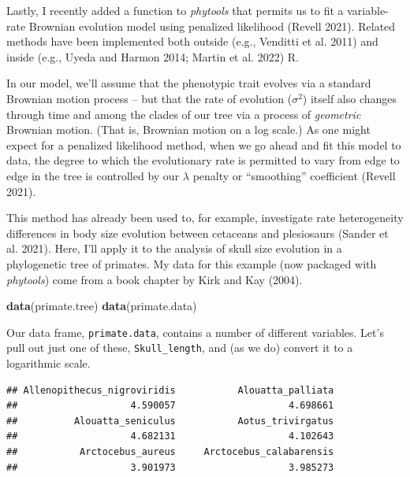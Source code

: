 \documentclass[fleqn,10pt,lineno]{wlpeerj} %
\newenvironment{Shaded}{\begin{snugshade}}{\end{snugshade}}
\newcommand{\FunctionTok}[1]{\textcolor[rgb]{0.13,0.29,0.53}{\textbf{#1}}}
\newcommand{\NormalTok}[1]{#1}
\newcommand{\OtherTok}[1]{\textcolor[rgb]{0.56,0.35,0.01}{#1}}
\newcommand{\SpecialCharTok}[1]{\textcolor[rgb]{0.81,0.36,0.00}{\textbf{#1}}}
\begin{document}
Lastly, I recently added a function to \emph{phytools} that permits us to fit a variable-rate Brownian evolution model using penalized likelihood (Revell 2021). Related methods have been implemented both outside (e.g., Venditti et al. 2011) and inside (e.g., Uyeda and Harmon 2014; Martin et al. 2022) R.

In our model, we'll assume that the phenotypic trait evolves via a standard Brownian motion process -- but that the rate of evolution (\(\sigma^{2}\)) itself also changes through time and among the clades of our tree via a process of \emph{geometric} Brownian motion. (That is, Brownian motion on a log scale.) As one might expect for a penalized likelihood method, when we go ahead and fit this model to data, the degree to which the evolutionary rate is permitted to vary from edge to edge in the tree is controlled by our \(\lambda\) penalty or ``smoothing'' coefficient (Revell 2021).

This method has already been used to, for example, investigate rate heterogeneity differences in body size evolution between cetaceans and plesiosaurs (Sander et al. 2021). Here, I'll apply it to the analysis of skull size evolution in a phylogenetic tree of primates. My data for this example (now packaged with \emph{phytools}) come from a book chapter by Kirk and Kay (2004).

\begin{Shaded}
\begin{Highlighting}[]
\FunctionTok{data}\NormalTok{(primate.tree)}
\FunctionTok{data}\NormalTok{(primate.data)}
\end{Highlighting}
\end{Shaded}

Our data frame, \texttt{primate.data}, contains a number of different variables. Let's pull out just one of these, \texttt{Skull\_length}, and (as we do) convert it to a logarithmic scale.

\begin{Shaded}
\end{Shaded}

\begin{verbatim}
## Allenopithecus_nigroviridis           Alouatta_palliata 
##                    4.590057                    4.698661 
##          Alouatta_seniculus           Aotus_trivirgatus 
##                    4.682131                    4.102643 
##           Arctocebus_aureus     Arctocebus_calabarensis 
##                    3.901973                    3.985273
\end{verbatim}
\end{document}
